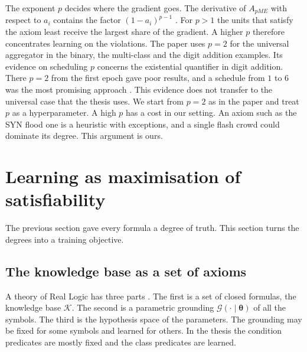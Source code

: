 The exponent $p$ decides where the gradient goes. The derivative of $A_{pME}$
with respect to $a_i$ contains the factor $(1-a_i)^{p-1}$
\citep{badreddine2022ltn}. For $p>1$ the units that satisfy the axiom least
receive the largest share of the gradient. A higher $p$ therefore concentrates
learning on the violations. The paper uses $p=2$ for the universal aggregator
in the binary, the multi-class and the digit addition examples. Its evidence on
scheduling $p$ concerns the existential quantifier in digit addition. There
$p=2$ from the first epoch gave poor results, and a schedule from $1$ to $6$
was the most promising approach \citep{badreddine2022ltn}. This evidence does
not transfer to the universal case that the thesis uses. We start from $p=2$
as in the paper and treat $p$ as a hyperparameter. A high $p$ has a cost in
our setting. An axiom such as the SYN flood one is a heuristic with
exceptions, and a single flash crowd could dominate its degree. This
argument is ours.

\section{Learning as maximisation of satisfiability}
\label{sec:learning-satisfiability}

The previous section gave every formula a degree of truth. This section turns
the degrees into a training objective.

\subsection{The knowledge base as a set of axioms}
\label{sec:knowledge-base}

A theory of Real Logic has three parts \citep{badreddine2022ltn}. The first is
a set of closed formulas, the knowledge base $\mathcal{K}$. The second is a
parametric grounding $\mathcal{G}(\cdot\mid\boldsymbol{\theta})$ of all the
symbols. The third is the hypothesis space of the parameters. The grounding
may be fixed for some symbols and learned for others. In the thesis the
condition predicates are mostly fixed and the class predicates are learned.

